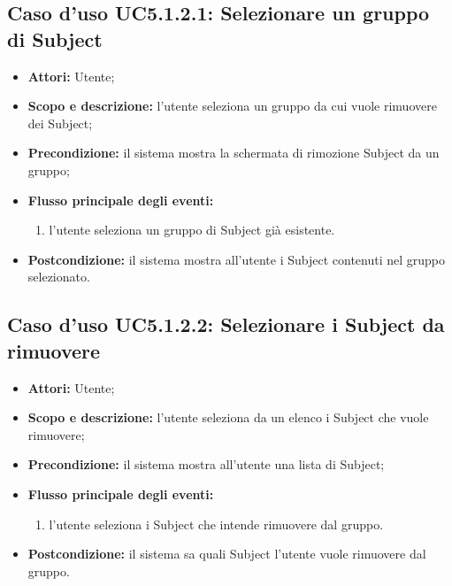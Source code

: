 \subsection{Caso d'uso UC5.1.2.1: Selezionare un gruppo di Subject}
\begin{itemize}
\item \textbf{Attori:} Utente;
\item \textbf{Scopo e descrizione:} l'utente seleziona un gruppo da cui vuole rimuovere dei Subject\glossario{};
\item \textbf{Precondizione:} il sistema mostra la schermata di rimozione Subject\glossario{} da un gruppo;
\item \textbf{Flusso principale degli eventi:}
\begin{enumerate}
\item l'utente seleziona un gruppo di Subject\glossario{} già esistente.
\end{enumerate}
\item \textbf{Postcondizione:} il sistema mostra all'utente i Subject\glossario{} contenuti nel gruppo selezionato.
\end{itemize}

\subsection{Caso d'uso UC5.1.2.2: Selezionare i Subject da rimuovere}
\begin{itemize}
\item \textbf{Attori:} Utente;
\item \textbf{Scopo e descrizione:} l'utente seleziona da un elenco i Subject\glossario{} che vuole rimuovere;
\item \textbf{Precondizione:} il sistema mostra all'utente una lista di Subject\glossario{};
\item \textbf{Flusso principale degli eventi:}
\begin{enumerate}
\item l'utente seleziona i Subject\glossario{} che intende rimuovere dal gruppo.
\end{enumerate}
\item \textbf{Postcondizione:} il sistema sa quali Subject\glossario{} l'utente vuole rimuovere dal gruppo.
\end{itemize}

